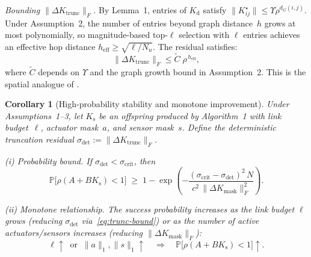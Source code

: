 \documentclass[conference]{IEEEtran}
\newtheorem{corollary}{Corollary}
\begin{document}
\emph{Bounding $\|\Delta K_{\mathrm{trunc}}\|_F$.}
By Lemma~1, entries of $K_{\mathrm{d}}$ satisfy
$\|K^{\star}_{ij}\| \le \Upsilon \rho^{d_G(i,j)}$.
Under Assumption~2, the number of entries beyond graph
distance~$h$ grows at most polynomially,
so magnitude-based top-$\ell$ selection with $\ell$ entries
achieves an effective hop distance
$h_{\mathrm{eff}} \ge \sqrt{\ell / N_u}$.
The residual satisfies:
\begin{equation}\label{eq:trunc-bound}
  \|\Delta K_{\mathrm{trunc}}\|_{F}
  \le \widetilde{C}\;\rho^{\,h_{\mathrm{eff}}},
\end{equation}
where $\widetilde{C}$ depends on $\Upsilon$ and the graph
growth bound in Assumption~2.
This is the spatial analogue of
\cite[Corollary~3.5]{shin}.


\begin{corollary}[High-probability stability and monotone
  improvement]
\label{cor:prob-stab}
Under Assumptions~1--3, let $K_{\mathrm{s}}$ be an offspring
produced by Algorithm~1 with link budget~$\ell$, actuator
mask~$a$, and sensor mask~$s$.  Define the deterministic
truncation residual
$\sigma_{\mathrm{det}} :=
  \|\Delta K_{\mathrm{trunc}}\|_{F}$.

\emph{(i) Probability bound.}
If $\sigma_{\mathrm{det}} < \sigma_{\mathrm{crit}}$,
then
\begin{equation}\label{eq:prob-stab-bound}
  \mathbb{P}\bigl[\rho(A + B K_{\mathrm{s}}) < 1\bigr]
  \;\ge\;
  1 - \exp\!\left(
    -\frac{(\sigma_{\mathrm{crit}} - \sigma_{\mathrm{det}})^{2}\,N}
          {c^{2}\,\|\Delta K_{\mathrm{mask}}\|_{F}^{2}}
  \right).
\end{equation}

\emph{(ii) Monotone relationship.}
The success probability increases as
the link budget $\ell$ grows (reducing $\sigma_{\mathrm{det}}$
via~\eqref{eq:trunc-bound})
or as the number of active actuators/sensors increases
(reducing $\|\Delta K_{\mathrm{mask}}\|_{F}$):
\begin{equation}\label{eq:monotone-prob}
  \ell \uparrow \;\;\text{or}\;\;
  \|a\|_1,\|s\|_1 \uparrow
  \quad\Longrightarrow\quad
  \mathbb{P}\bigl[\rho(A + B K_{\mathrm{s}}) < 1\bigr] \uparrow.
\end{equation}

\end{corollary}
\end{document}
